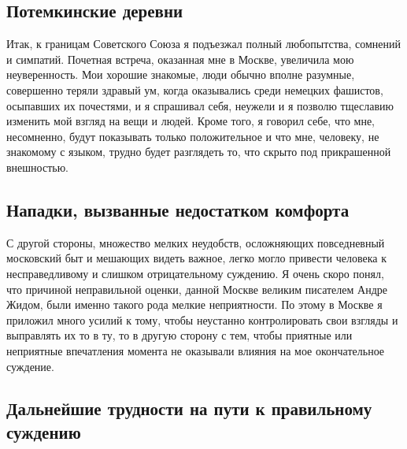 \documentclass[12pt, a4paper, openany]{book}
\begin{document}
\subsection*{Потемкинские деревни}
Итак, к границам Советского Союза я подъезжал полный любопытства, сомнений и симпатий. Почетная встреча, оказанная мне в Москве, увеличила мою неуверенность. Мои хорошие знакомые, люди обычно вполне разумные, совершенно теряли здравый ум, когда оказывались среди немецких фашистов, осыпавших их почестями, и я спрашивал себя, неужели и я позволю тщеславию изменить мой взгляд на вещи и людей. Кроме того, я говорил себе, что мне, несомненно, будут показывать только положительное и что мне, человеку, не знакомому с языком, трудно будет разглядеть то, что скрыто под прикрашенной внешностью.

\subsection*{Нападки, вызванные недостатком комфорта}
  
С другой стороны, множество мелких неудобств, осложняющих повседневный московский быт и мешающих видеть важное, легко могло привести человека к несправедливому и слишком отрицательному суждению. Я очень скоро понял, что причиной неправильной оценки, данной Москве великим писателем Андре Жидом, были именно такого рода мелкие неприятности. По этому в Москве я приложил много усилий к тому, чтобы неустанно контролировать свои взгляды и выправлять их то в ту, то в другую сторону с тем, чтобы приятные или неприятные впечатления момента не оказывали влияния на мое окончательное суждение.


\subsection*{Дальнейшие трудности на пути к правильному суждению}
\end{document}
